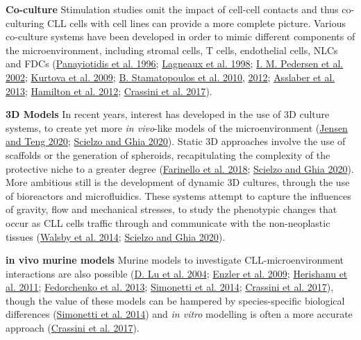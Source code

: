 \documentclass[11pt, a4paper, twosided]{book}
\begin{document}
\textbf{Co-culture}
Stimulation studies omit the impact of cell-cell contacts and thus co-culturing CLL cells with cell lines can provide a more complete picture. Various co-culture systems have been developed in order to mimic different components of the microenvironment, including stromal cells, T cells, endothelial cells, NLCs and FDCs (\protect\hyperlink{ref-Panayiotidis1996}{Panayiotidis et al. 1996}; \protect\hyperlink{ref-Lagneaux1998}{Lagneaux et al. 1998}; \protect\hyperlink{ref-Pedersen2002}{I. M. Pedersen et al. 2002}; \protect\hyperlink{ref-Kurtova2009}{Kurtova et al. 2009}; \protect\hyperlink{ref-Stamatopoulos2010}{B. Stamatopoulos et al. 2010}, \protect\hyperlink{ref-Stamatopoulos2012}{2012}; \protect\hyperlink{ref-Asslaber2013}{Asslaber et al. 2013}; \protect\hyperlink{ref-Hamilton2012}{Hamilton et al. 2012}; \protect\hyperlink{ref-Crassini2017}{Crassini et al. 2017}).

\textbf{3D Models}
In recent years, interest has developed in the use of 3D culture systems, to create yet more \emph{in vivo}-like models of the microenvironment (\protect\hyperlink{ref-Jensen2020}{Jensen and Teng 2020}; \protect\hyperlink{ref-Scielzo2020}{Scielzo and Ghia 2020}). Static 3D approaches involve the use of scaffolds or the generation of spheroids, recapitulating the complexity of the protective niche to a greater degree (\protect\hyperlink{ref-Farinello2018}{Farinello et al. 2018}; \protect\hyperlink{ref-Scielzo2020}{Scielzo and Ghia 2020}). More ambitious still is the development of dynamic 3D cultures, through the use of bioreactors and microfluidics. These systems attempt to capture the influences of gravity, flow and mechanical stresses, to study the phenotypic changes that occur as CLL cells traffic through and communicate with the non-neoplastic tissues (\protect\hyperlink{ref-Walsby2014}{Walsby et al. 2014}; \protect\hyperlink{ref-Scielzo2020}{Scielzo and Ghia 2020}).

\textbf{in vivo murine models}
Murine models to investigate CLL-microenvironment interactions are also possible (\protect\hyperlink{ref-Lu2004}{D. Lu et al. 2004}; \protect\hyperlink{ref-Enzler2009}{Enzler et al. 2009}; \protect\hyperlink{ref-Herishanu2011}{Herishanu et al. 2011}; \protect\hyperlink{ref-Fedorchenko2013}{Fedorchenko et al. 2013}; \protect\hyperlink{ref-Simonetti2014}{Simonetti et al. 2014}; \protect\hyperlink{ref-Crassini2017}{Crassini et al. 2017}), though the value of these models can be hampered by species-specific biological differences (\protect\hyperlink{ref-Simonetti2014}{Simonetti et al. 2014}) and \emph{in vitro} modelling is often a more accurate approach (\protect\hyperlink{ref-Crassini2017}{Crassini et al. 2017}).
\end{document}
